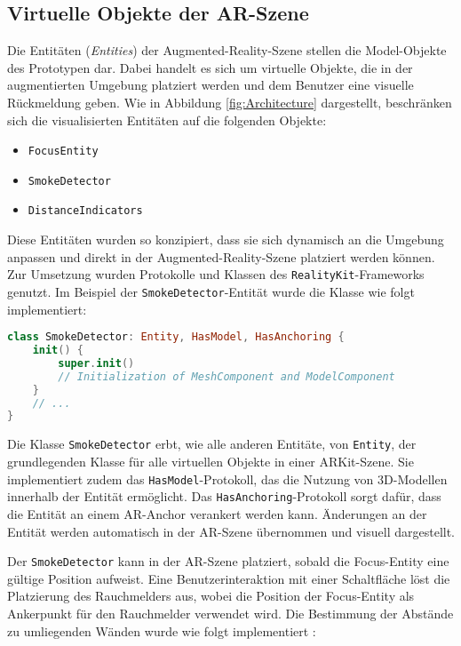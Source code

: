 \subsection{Virtuelle Objekte der AR-Szene}

Die Entitäten (\textit{Entities}) der Augmented-Reality-Szene stellen die Model-Objekte des Prototypen dar. Dabei handelt es sich um virtuelle Objekte, die in der augmentierten Umgebung platziert werden und dem Benutzer eine visuelle Rückmeldung geben. Wie in Abbildung \ref{fig:Architecture} dargestellt, beschränken sich die visualisierten Entitäten auf die folgenden Objekte:

\begin{itemize}
    \item \texttt{FocusEntity}
    \item \texttt{SmokeDetector}
    \item \texttt{DistanceIndicators}
\end{itemize}

Diese Entitäten wurden so konzipiert, dass sie sich dynamisch an die Umgebung anpassen und direkt in der Augmented-Reality-Szene platziert werden können. Zur Umsetzung wurden Protokolle und Klassen des \texttt{RealityKit}-Frameworks genutzt. Im Beispiel der \texttt{SmokeDetector}-Entität wurde die Klasse wie folgt implementiert:

\begin{lstlisting}[language=Swift]
class SmokeDetector: Entity, HasModel, HasAnchoring {
    init() {
        super.init()
        // Initialization of MeshComponent and ModelComponent
    }
    // ...
}
\end{lstlisting}

Die Klasse \texttt{SmokeDetector} erbt, wie alle anderen Entitäte, von \texttt{Entity}, der grundlegenden Klasse für alle virtuellen Objekte in einer ARKit-Szene. Sie implementiert zudem das \texttt{HasModel}-Protokoll, das die Nutzung von 3D-Modellen innerhalb der Entität ermöglicht. Das \texttt{HasAnchoring}-Protokoll sorgt dafür, dass die Entität an einem AR-Anchor verankert werden kann. Änderungen an der Entität werden automatisch in der AR-Szene übernommen und visuell dargestellt.

Der \texttt{SmokeDetector} kann in der AR-Szene platziert, sobald die Focus-Entity eine gültige Position aufweist. Eine Benutzerinteraktion mit einer Schaltfläche löst die Platzierung des Rauchmelders aus, wobei die Position der Focus-Entity als Ankerpunkt für den Rauchmelder verwendet wird. Die Bestimmung der Abstände zu umliegenden Wänden wurde wie folgt implementiert \cite{appledevdoc}:

